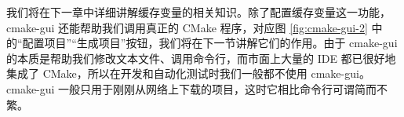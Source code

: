 
我们将在下一章中详细讲解缓存变量的相关知识。除了配置缓存变量这一功能，cmake-gui 还能帮助我们调用真正的 CMake 程序，对应图 \ref{fig:cmake-gui-2} 中的“配置项目”“生成项目”按钮，我们将在下一节讲解它们的作用。由于 cmake-gui 的本质是帮助我们修改文本文件、调用命令行，而市面上大量的 IDE 都已很好地集成了 CMake，所以在开发和自动化测试时我们一般都不使用 cmake-gui。cmake-gui 一般只用于刚刚从网络上下载的项目，这时它相比命令行可谓简而不繁。

